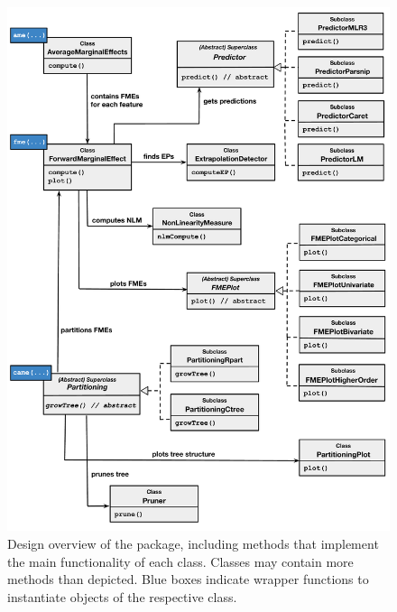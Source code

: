 \begin{figure}[htp]
    \centering
    \includegraphics[width=14cm]{figures/fmeffects_architecture.pdf}
    \caption{Design overview of the  package, including methods that implement the main functionality of each class. Classes may contain more methods than depicted.
    Blue boxes indicate wrapper functions to instantiate objects of the respective class.}
    \label{fig:architecture}
\end{figure}

